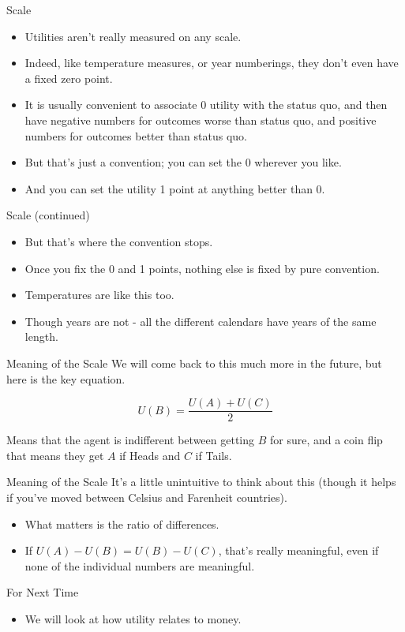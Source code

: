 \documentclass[
  ignorenonframetext,
]{beamer}
\providecommand{\tightlist}{%
  \setlength{\itemsep}{0pt}\setlength{\parskip}{0pt}}
\begin{document}
\begin{frame}{Scale}
\protect\hypertarget{scale}{}
\begin{itemize}
\tightlist
\item
  Utilities aren't really measured on any scale.
\item
  Indeed, like temperature measures, or year numberings, they don't even
  have a fixed zero point.
\item
  It is usually convenient to associate 0 utility with the status quo,
  and then have negative numbers for outcomes worse than status quo, and
  positive numbers for outcomes better than status quo.
\item
  But that's just a convention; you can set the 0 wherever you like.
\item
  And you can set the utility 1 point at anything better than 0.
\end{itemize}
\end{frame}

\begin{frame}{Scale (continued)}
\protect\hypertarget{scale-continued}{}
\begin{itemize}
\tightlist
\item
  But that's where the convention stops.
\item
  Once you fix the 0 and 1 points, nothing else is fixed by pure
  convention.
\item
  Temperatures are like this too.
\item
  Though years are not - all the different calendars have years of the
  same length.
\end{itemize}
\end{frame}

\begin{frame}{Meaning of the Scale}
\protect\hypertarget{meaning-of-the-scale}{}
We will come back to this much more in the future, but here is the key
equation.

\[
U(B) = \frac{U(A) + U(C)}{2}
\]

Means that the agent is indifferent between getting \(B\) for sure, and
a coin flip that means they get \(A\) if Heads and \(C\) if Tails.
\end{frame}

\begin{frame}{Meaning of the Scale}
\protect\hypertarget{meaning-of-the-scale-1}{}
It's a little unintuitive to think about this (though it helps if you've
moved between Celsius and Farenheit countries).

\begin{itemize}
\tightlist
\item
  What matters is the ratio of differences.
\item
  If \(U(A) - U(B) = U(B) - U(C)\), that's really meaningful, even if
  none of the individual numbers are meaningful.
\end{itemize}
\end{frame}

\begin{frame}{For Next Time}
\protect\hypertarget{for-next-time}{}
\begin{itemize}
\tightlist
\item
  We will look at how utility relates to money.
\end{itemize}
\end{frame}
\end{document}
